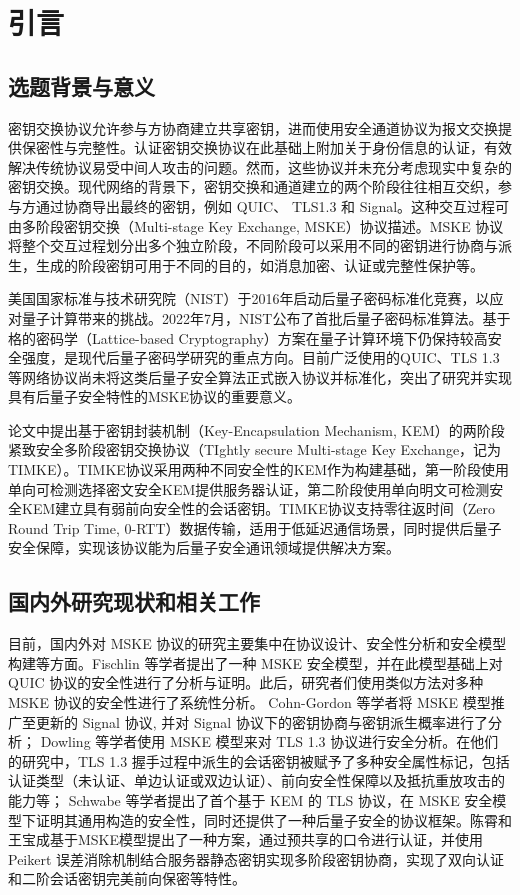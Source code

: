 \section{引言}

\subsection{选题背景与意义}

密钥交换协议允许参与方协商建立共享密钥，进而使用安全通道协议为报文交换提供保密性与完整性。认证密钥交换协议在此基础上附加关于身份信息的认证，有效解决传统协议易受中间人攻击的问题。然而，这些协议并未充分考虑现实中复杂的密钥交换。现代网络的背景下，密钥交换和通道建立的两个阶段往往相互交织，参与方通过协商导出最终的密钥，例如 QUIC、 TLS1.3 和 Signal。这种交互过程可由多阶段密钥交换（Multi-stage Key Exchange, MSKE）协议描述。MSKE 协议将整个交互过程划分出多个独立阶段，不同阶段可以采用不同的密钥进行协商与派生，生成的阶段密钥可用于不同的目的，如消息加密、认证或完整性保护等。

美国国家标准与技术研究院（NIST）于2016年启动后量子密码标准化竞赛，以应对量子计算带来的挑战。2022年7月，NIST公布了首批后量子密码标准算法。基于格的密码学（Lattice-based Cryptography）方案在量子计算环境下仍保持较高安全强度，是现代后量子密码学研究的重点方向。目前广泛使用的QUIC、TLS 1.3等网络协议尚未将这类后量子安全算法正式嵌入协议并标准化，突出了研究并实现具有后量子安全特性的MSKE协议的重要意义。

论文\cite{timke_2024}中提出基于密钥封装机制（Key-Encapsulation Mechanism, KEM）的两阶段紧致安全多阶段密钥交换协议（TIghtly secure Multi-stage Key Exchange，记为TIMKE）。TIMKE协议采用两种不同安全性的KEM作为构建基础，第一阶段使用单向可检测选择密文安全KEM提供服务器认证，第二阶段使用单向明文可检测安全KEM建立具有弱前向安全性的会话密钥。TIMKE协议支持零往返时间（Zero Round Trip Time, 0-RTT）数据传输，适用于低延迟通信场景，同时提供后量子安全保障，实现该协议能为后量子安全通讯领域提供解决方案。

\subsection{国内外研究现状和相关工作}

目前，国内外对 MSKE 协议的研究主要集中在协议设计、安全性分析和安全模型构建等方面。Fischlin 等学者\cite{fischlin_multi-stage_2014}提出了一种 MSKE 安全模型，并在此模型基础上对 QUIC 协议的安全性进行了分析与证明。此后，研究者们使用类似方法对多种 MSKE 协议的安全性进行了系统性分析。 Cohn-Gordon 等学者\cite{cohn-gordon_formal_2016}将 MSKE 模型推广至更新的 Signal 协议, 并对 Signal 协议下的密钥协商与密钥派生概率进行了分析； Dowling 等学者\cite{dowling_cryptographic_2020}使用 MSKE 模型来对 TLS 1.3 协议进行安全分析。在他们的研究中，TLS 1.3 握手过程中派生的会话密钥被赋予了多种安全属性标记，包括认证类型（未认证、单边认证或双边认证）、前向安全性保障以及抵抗重放攻击的能力等； Schwabe 等学者\cite{schwabe_post-quantum_2020}提出了首个基于 KEM 的 TLS 协议，在 MSKE 安全模型下证明其通用构造的安全性，同时还提供了一种后量子安全的协议框架。陈霄和王宝成\cite{ideal_lattice_2023}基于MSKE模型提出了一种方案，通过预共享的口令进行认证，并使用 Peikert 误差消除机制结合服务器静态密钥实现多阶段密钥协商，实现了双向认证和二阶会话密钥完美前向保密等特性。

